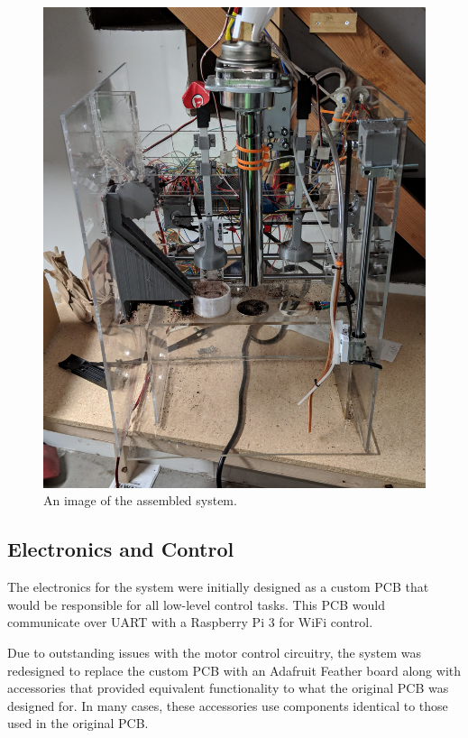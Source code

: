 \documentclass[conference]{IEEEtran}
\begin{document}
\begin{figure}
  \centering
    \includegraphics[width=1.8\columnwidth]{fullSystem}
    \caption{An image of the assembled system.}
\end{figure}

\subsection{Electronics and Control}
The electronics for the system were initially designed as
a custom PCB that would be responsible for all low-level
control tasks. This PCB would communicate over UART with
a Raspberry Pi 3 for WiFi control.

Due to outstanding issues with the motor control circuitry,
the system was redesigned to replace the custom PCB with an
Adafruit Feather board along with accessories that provided
equivalent functionality to what the original PCB was designed
for. In many cases, these accessories use components identical
to those used in the original PCB.
\end{document}
